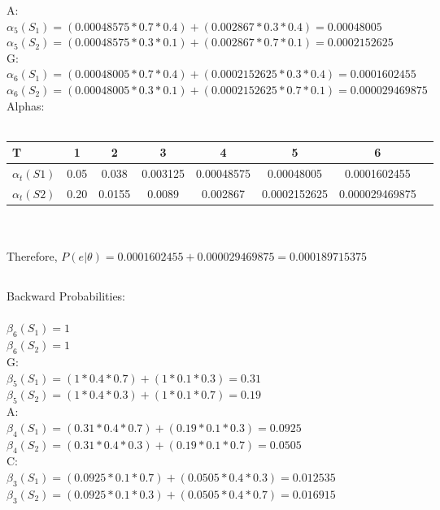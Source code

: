 \documentclass[paper=a4, fontsize=11pt]{scrartcl} %
\numberwithin{equation}{section} %
\numberwithin{figure}{section} %
\numberwithin{table}{section} %
\begin{document}
A:\\
$\alpha_{5}(S_{1}) = (0.00048575*0.7*0.4)+ (0.002867*0.3*0.4)= 0.00048005$\\
$\alpha_{5}(S_{2}) = (0.00048575*0.3*0.1)+ (0.002867*0.7*0.1)= 0.0002152625$\\

G:\\
$\alpha_{6}(S_{1}) = (0.00048005*0.7*0.4)+ (0.0002152625*0.3*0.4)= 0.0001602455$\\
$\alpha_{6}(S_{2}) = (0.00048005*0.3*0.1)+ (0.0002152625*0.7*0.1)= 0.000029469875$\\

Alphas:\\\\
\begin{tabular}{l*{7}{c}}
\textbf{T} & \textbf{1} &  \textbf{2} & \textbf{3} & \textbf{4} & \textbf{5} & \textbf{6} \\
\hline
\textbf{$\alpha_{t}(S1)$} & 0.05 & 0.038 & 0.003125 & 0.00048575 & 0.00048005 & 0.0001602455\\
\textbf{$\alpha_{t}(S2)$} & 0.20 & 0.0155 & 0.0089 & 0.002867 & 0.0002152625 & 0.000029469875
\end{tabular}\\\\

Therefore, $P(e|\theta)=0.0001602455+0.000029469875 = 0.000189715375$

\subsection{}
Backward Probabilities:\\\\


$\beta_{6}(S_{1}) = 1$\\
$\beta_{6}(S_{2}) = 1$\\

G:\\
$\beta_{5}(S_{1}) = (1*0.4*0.7) + (1*0.1*0.3) = 0.31$\\
$\beta_{5}(S_{2}) = (1*0.4*0.3) + (1*0.1*0.7) = 0.19$\\


A:\\
$\beta_{4}(S_{1}) = (0.31*0.4*0.7) + (0.19*0.1*0.3) = 0.0925$\\
$\beta_{4}(S_{2}) = (0.31*0.4*0.3) + (0.19*0.1*0.7) = 0.0505$\\

C:\\
$\beta_{3}(S_{1}) = (0.0925*0.1*0.7) + (0.0505*0.4*0.3) = 0.012535$\\
$\beta_{3}(S_{2}) = (0.0925*0.1*0.3) + (0.0505*0.4*0.7) = 0.016915$\\
\end{document}
